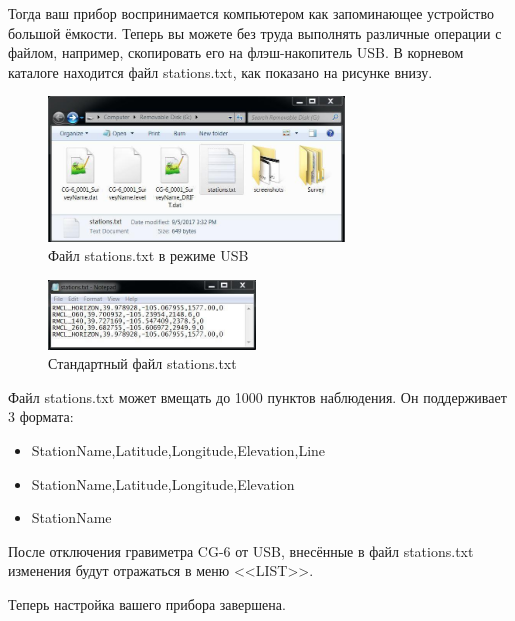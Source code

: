 
Тогда ваш прибор \cg{} воспринимается компьютером как запоминающее устройство
большой ёмкости. Теперь вы можете без труда выполнять различные операции с
файлом, например, скопировать его на флэш-накопитель USB. В корневом каталоге
находится файл stations.txt, как показано на рисунке внизу.

\begin{figure}[H]
  \centering
  \includegraphics[width=0.7\textwidth]{figures/stations.txt_file_in_usb_mode}
  \caption{Файл stations.txt в режиме USB}
  \label{fig:stations.txt_file_in_usb_mode}
\end{figure}

\begin{figure}[H]
  \centering
  \includegraphics[width=0.49\textwidth]{figures/default_stations.txt_file}
  \caption{Стандартный файл stations.txt}
  \label{fig:default_stations.txt_file}
\end{figure}

Файл stations.txt может вмещать до 1000 пунктов наблюдения. Он поддерживает 3
формата:
\begin{itemize}
  \item StationName,Latitude,Longitude,Elevation,Line
  \item StationName,Latitude,Longitude,Elevation
  \item StationName
\end{itemize}

После отключения гравиметра CG-6 от USB, внесённые в файл stations.txt изменения
будут отражаться в меню <<LIST>>.


Теперь настройка вашего прибора \cg{} завершена.

